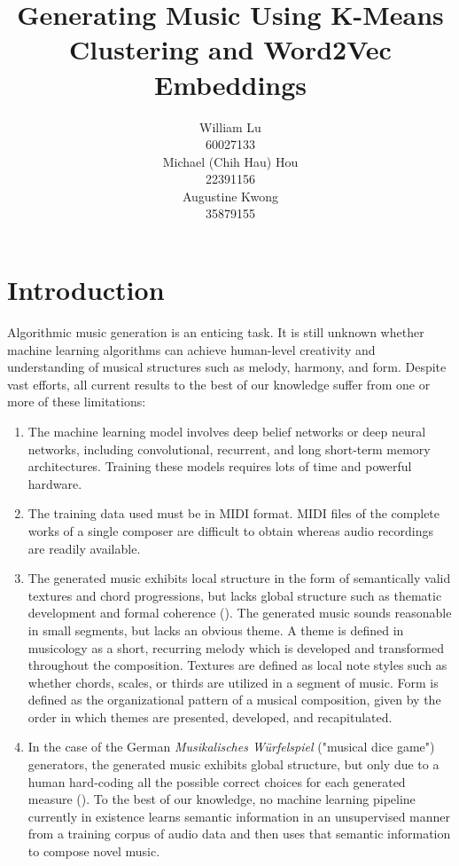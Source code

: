 \documentclass{article}
\title{Generating Music Using K-Means Clustering and Word2Vec Embeddings}
\author{
    William Lu \\
    60027133 \\
    \And
    Michael (Chih Hau) Hou \\
    22391156 \\
    \And
    Augustine Kwong \\
    35879155 \\
}
\begin{document}
\maketitle

\section{Introduction}

Algorithmic music generation is an enticing task. It is still unknown whether machine learning algorithms can achieve human-level creativity and understanding of musical structures such as melody, harmony, and form. Despite vast efforts, all current results to the best of our knowledge suffer from one or more of these limitations:

\begin{enumerate}
    \item The machine learning model involves deep belief networks or deep neural networks, including convolutional, recurrent, and long short-term memory architectures. Training these models requires lots of time and powerful hardware.
    \item The training data used must be in MIDI format. MIDI files of the complete works of a single composer are difficult to obtain whereas audio recordings are readily available.
    \item The generated music exhibits local structure in the form of semantically valid textures and chord progressions, but lacks global structure such as thematic development and formal coherence (\cite{music_generation_by_deep}). The generated music sounds reasonable in small segments, but lacks an obvious theme. A theme is defined in musicology as a short, recurring melody which is developed and transformed throughout the composition. Textures are defined as local note styles such as whether chords, scales, or thirds are utilized in a segment of music. Form is defined as the organizational pattern of a musical composition, given by the order in which themes are presented, developed, and recapitulated.
    \item In the case of the German \textit{Musikalisches Würfelspiel} ("musical dice game") generators, the generated music exhibits global structure, but only due to a human hard-coding all the possible correct choices for each generated measure (\cite{algorithmic_composition_computational_thinking}). To the best of our knowledge, no machine learning pipeline currently in existence learns semantic information in an unsupervised manner from a training corpus of audio data and then uses that semantic information to compose novel music.
\end{enumerate}
\end{document}
